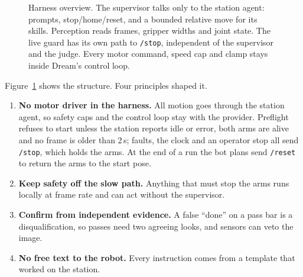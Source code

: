 \documentclass[10pt]{article}
\begin{document}
\begin{figure}[t]
\caption{Harness overview. The supervisor talks only to the station agent: prompts, stop/home/reset, and a bounded
relative move for its skills. Perception reads frames, gripper widths and joint state. The live guard has its own path
to \texttt{/stop}, independent of the supervisor and the judge. Every motor command, speed cap and clamp stays inside
Dream's control loop.}
\label{fig:arch}
\end{figure}

Figure~\ref{fig:arch} shows the structure. Four principles shaped it.
\begin{enumerate}
  \item \textbf{No motor driver in the harness.} All motion goes through the station agent, so safety caps and the control
  loop stay with the provider. Preflight refuses to start unless the station reports idle or error, both arms are alive and
  no frame is older than 2\,s; faults, the clock and an operator stop all send \texttt{/stop}, which holds the arms. At the
  end of a run the bot plans send \texttt{/reset} to return the arms to the start pose.
  \item \textbf{Keep safety off the slow path.} Anything that must stop the arms runs locally at frame rate and can act
  without the supervisor.
  \item \textbf{Confirm from independent evidence.} A false ``done'' on a pass bar is a disqualification, so passes need
  two agreeing looks, and sensors can veto the image.
  \item \textbf{No free text to the robot.} Every instruction comes from a template that worked on the station.
\end{enumerate}
\end{document}
